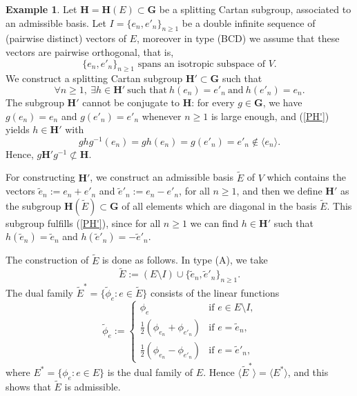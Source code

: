 \documentclass[12pt]{amsart}
\newcommand{\G}{\mathbf{G}}
\renewcommand{\H}{\mathbf{H}}
\renewcommand{\span}[1]{\langle #1\rangle}
\numberwithin{equation}{section}
\theoremstyle{definition}
\newtheorem{example}[theorem]{Example}
\begin{document}
\begin{example}
\label{E2}
Let $\H=\H(E)\subset \G$ be a splitting Cartan subgroup, associated to an admissible basis. Let $I=\{e_n,e'_n\}_{n\geq 1}$ be a double infinite sequence of (pairwise distinct) vectors of $E$, moreover in type (BCD) we assume that these vectors are pairwise orthogonal, that is,
\begin{equation}
\label{Iisotropic}
\mbox{$\{e_n,e'_n\}_{n\geq 1}$ spans an isotropic subspace of $V$.}
\end{equation}
We construct a splitting Cartan subgroup $\H'\subset\G$ such that
\begin{equation}
\label{PH'}
\forall n\geq 1,\ \exists h\in\H'\ \mbox{such that}\ h(e_n)=e'_n\ \mbox{and}\ h(e'_n)=e_n.
\end{equation}
The subgroup $\H'$ cannot be conjugate to $\H$: for every $g\in\G$, we have $g(e_n)=e_n$ and $g(e'_n)=e'_n$ whenever $n\geq 1$ is large enough,
and (\ref{PH'}) yields $h\in\H'$ with
\[ghg^{-1}(e_n)=gh(e_n)=g(e'_n)=e'_n\notin\span{e_n}.\]
Hence, $g\H'g^{-1}\not\subset\H$.

For constructing $\H'$, we construct an admissible basis $\tilde{E}$ of $V$ which contains the vectors $\tilde{e}_n:=e_n+e'_n$ and $\tilde{e}'_n:=e_n-e'_n$, for all $n\geq 1$, and then we define $\H'$ as the subgroup $\H(\tilde{E})\subset\G$ of all elements which are diagonal in the basis $\tilde{E}$. This subgroup fulfills (\ref{PH'}),
since for all $n\geq 1$ we can find $h\in\H'$
such that $h(\tilde{e}_n)=\tilde{e}_n$ and $h(\tilde{e}'_n)=-\tilde{e}'_n$.

The construction of $\tilde{E}$ is done as follows. In type (A), we take
\[
\tilde{E}:=(E\setminus I)\cup \{\tilde{e}_n,\tilde{e}'_n\}_{n\geq 1}.
\]
The dual family $\tilde{E}^*=\{\tilde\phi_e:e\in \tilde{E}\}$ consists of the linear functions
\[
\tilde\phi_e:=\left\{\begin{array}{ll}
\phi_e & \mbox{if $e\in E\setminus I$,} \\
\frac{1}{2}(\phi_{e_n}+\phi_{e'_n}) & \mbox{if $e=\tilde{e}_n$,} \\
\frac{1}{2}(\phi_{e_n}-\phi_{e'_n}) & \mbox{if $e=\tilde{e}'_n$,}
\end{array}\right.
\]
where $E^*=\{\phi_e:e\in E\}$ is the dual family of $E$. Hence $\langle \tilde{E}^*\rangle=\langle E^*\rangle$, and this shows that $\tilde{E}$ is admissible.


\end{example}
\end{document}
